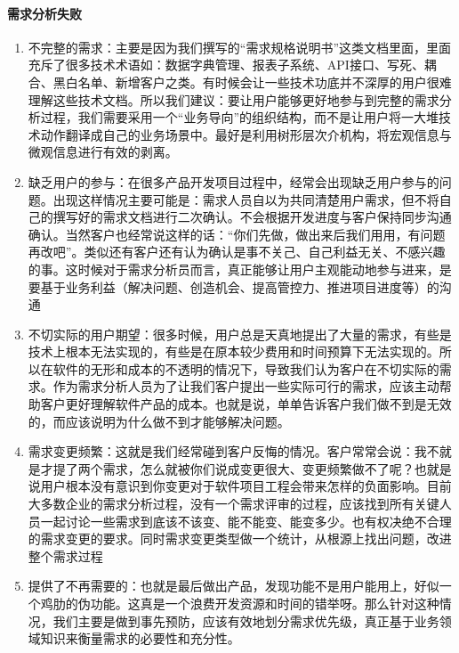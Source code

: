 \documentclass[letterpaper,11pt,english]{sphinxmanual}
\begin{document}
\paragraph{需求分析失败}
\label{\detokenize{chapter_knowledge/need_analysis:id15}}\begin{enumerate}
%
\item {} 
不完整的需求：主要是因为我们撰写的“需求规格说明书”这类文档里面，里面充斥了很多技术术语如：数据字典管理、报表子系统、API接口、写死、耦合、黑白名单、新增客户之类。有时候会让一些技术功底并不深厚的用户很难理解这些技术文档。所以我们建议：要让用户能够更好地参与到完整的需求分析过程，我们需要采用一个“业务导向”的组织结构，而不是让用户将一大堆技术动作翻译成自己的业务场景中。最好是利用树形层次介机构，将宏观信息与微观信息进行有效的剥离。

\item {} 
缺乏用户的参与：在很多产品开发项目过程中，经常会出现缺乏用户参与的问题。出现这样情况主要可能是：需求人员自以为共同清楚用户需求，但不将自己的撰写好的需求文档进行二次确认。不会根据开发进度与客户保持同步沟通确认。当然客户也经常说这样的话：“你们先做，做出来后我们用用，有问题再改吧”。类似还有客户还有认为确认是事不关己、自己利益无关、不感兴趣的事。这时候对于需求分析员而言，真正能够让用户主观能动地参与进来，是要基于业务利益（解决问题、创造机会、提高管控力、推进项目进度等）的沟通

\item {} 
不切实际的用户期望：很多时候，用户总是天真地提出了大量的需求，有些是技术上根本无法实现的，有些是在原本较少费用和时间预算下无法实现的。所以在软件的无形和成本的不透明的情况下，导致我们认为客户在不切实际的需求。作为需求分析人员为了让我们客户提出一些实际可行的需求，应该主动帮助客户更好理解软件产品的成本。也就是说，单单告诉客户我们做不到是无效的，而应该说明为什么做不到才能够解决问题。

\item {} 
需求变更频繁：这就是我们经常碰到客户反悔的情况。客户常常会说：我不就是才提了两个需求，怎么就被你们说成变更很大、变更频繁做不了呢？也就是说用户根本没有意识到你变更对于软件项目工程会带来怎样的负面影响。目前大多数企业的需求分析过程，没有一个需求评审的过程，应该找到所有关键人员一起讨论一些需求到底该不该变、能不能变、能变多少。也有权决绝不合理的需求变更的要求。同时需求变更类型做一个统计，从根源上找出问题，改进整个需求过程

\item {} 
提供了不再需要的：也就是最后做出产品，发现功能不是用户能用上，好似一个鸡肋的伪功能。这真是一个浪费开发资源和时间的错举呀。那么针对这种情况，我们主要是做到事先预防，应该有效地划分需求优先级，真正基于业务领域知识来衡量需求的必要性和充分性。%
\begin{footnote}[472]\sphinxAtStartFootnote
{}
%
\end{footnote}

\end{enumerate}
\end{document}
